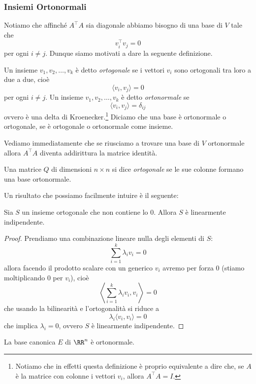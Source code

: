 \documentclass[11pt]{scrartcl}
\begin{document}
   	 \subsubsection{Insiemi Ortonormali}
   	 Notiamo che affinché $A^\intercal A$ sia diagonale abbiamo bisogno di una base di $V$ tale che 
   	 $$v_i^\intercal v_j=0$$
   	 per ogni $i\ne j$. Dunque siamo motivati a dare la seguente definizione.
   	 \begin{definition}
   	 	Un insieme $v_1,v_2,\dots,v_k$ è detto \textit{ortogonale} se i vettori $v_i$ sono ortogonali tra loro a due a due, cioè 
   	 	$$\langle v_i,v_j\rangle=0$$ 
   	 	per ogni $i\ne j$. Un insieme $v_1,v_2,\dots,v_k$ è detto \textit{ortonormale} se 
   	 	$$\langle v_i,v_j\rangle = \delta_{ij}$$
   	 	ovvero è una delta di Kroenecker.\footnote{Notiamo che in effetti questa definizione è proprio equivalente a dire che, se $A$ è la matrice con colonne i vettori $v_i$, allora $A^\intercal A=I$.} Diciamo che una base è ortonormale o ortogonale, se è ortogonale o ortonormale come insieme.
   	 \end{definition}
   	 Vediamo immediatamente che se riusciamo a trovare una base di $V$ ortonormale allora $A^\intercal A$ diventa addirittura la matrice identità.
   	 \begin{definition}
   	 	Una matrice $Q$ di dimensioni $n\times n$  si dice \textit{ortogonale} se le sue colonne formano una base ortonormale.
   	 \end{definition}
   	 Un risultato che possiamo facilmente intuire è il seguente:
   	 \begin{lemma}
   	 	Sia $S$ un insieme ortogonale che non contiene lo $0$. Allora $S$ è linearmente indipendente.
   	 \end{lemma}
   	 \begin{proof}
   	 	Prendiamo una combinazione lineare nulla degli elementi di $S$:
   	 	$$\sum_{i=1}^k \lambda_i v_i=0$$
   	 	allora facendo il prodotto scalare con un generico $v_i$ avremo per forza $0$ (stiamo moltiplicando $0$ per $v_i$), cioè
   	 	$$\left\langle \sum_{i=1}^k \lambda_i v_i,v_i\right\rangle=0$$
   	 	che usando la bilinearità e l'ortogonalità si riduce a 
   	 	$$\lambda_i\langle v_i,v_i\rangle=0$$
   	 	che implica $\lambda_i=0$, ovvero $S$ è linearmente indipendente.
   	 \end{proof}
   	 \begin{example}
   	 	La base canonica $E$ di $\RR^n$ è ortonormale.
   	 \end{example}
\end{document}
